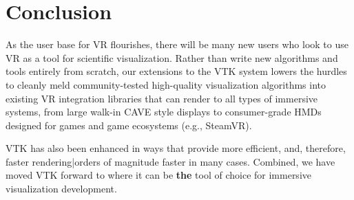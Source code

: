 \section{Conclusion}

As the user base for VR flourishes, there will be many
new users who look to use VR as a tool for scientific visualization.
Rather than write new algorithms and tools entirely from scratch,
our extensions to the VTK system lowers the hurdles to cleanly
meld community-tested high-quality visualization algorithms into
existing VR integration libraries that can render to
all types of immersive systems, from large walk-in CAVE style displays
to consumer-grade HMDs designed for games and game ecosystems (e.g., SteamVR).

VTK has also been enhanced in ways that provide more efficient, and,
therefore, faster rendering|orders of magnitude faster in many cases.
Combined, we have moved VTK forward to where it can be \textbf{the}
tool of choice for immersive visualization development.

